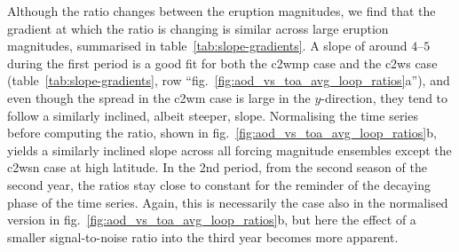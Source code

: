 \documentclass{ametsocV6.1}
\begin{document}
Although the ratio changes between the eruption magnitudes, we find that the gradient at
which the ratio is changing is similar across large eruption magnitudes, summarised in
table~\ref{tab:slope-gradients}. A slope of around \(4\)--\(5\) during the first period
is a good fit for both the \gls{c2wmp} case and the \gls{c2ws} case
(table~\ref{tab:slope-gradients}, row ``fig.~\ref{fig:aod_vs_toa_avg_loop_ratios}a''),
and even though the spread in the \gls{c2wm} case is large in the \(y\)-direction, they
tend to follow a similarly inclined, albeit steeper, slope. Normalising the time series
before computing the ratio, shown in fig.~\ref{fig:aod_vs_toa_avg_loop_ratios}b, yields
a similarly inclined slope across all forcing magnitude ensembles except the \gls{c2wsn}
case at high latitude. In the 2nd period, from the second season of the second year, the
ratios stay close to constant for the reminder of the decaying phase of the time series.
Again, this is necessarily the case also in the normalised version in
fig.~\ref{fig:aod_vs_toa_avg_loop_ratios}b, but here the effect of a smaller
signal-to-noise ratio into the third year becomes more apparent.
\end{document}
